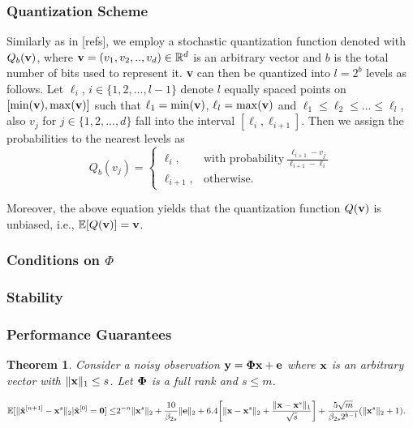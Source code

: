 \documentclass{article}
\newtheorem{theorem}{Theorem}
\begin{document}
\subsubsection{Quantization Scheme}
Similarly as in [refs], we employ a stochastic quantization function denoted with $Q_b({\bf v})$, where ${\bf v}=(v_1, v_2, .., v_d) \in \mathbb{R}^d$ is an arbitrary vector and $b$ is the total number of bits used to represent it. {\bf v} can then be quantized into $l=2^b$ levels as follows. Let $\ell_i$, $i\in \{1, 2, ..., l-1 \}$ denote $l$ equally spaced points on $[\min({\bf v}), \max({\bf v})]$ such that $\ell_1=\min({\bf v})$, $\ell_l=\max({\bf v})$ and $\ell_1\leq\ell_2 \leq ... \leq \ell_l$, also $v_j$ for $j\in \{1, 2, ..., d \}$ fall into the interval $[\ell_i, \ell_{i+1}]$. Then we assign the probabilities to the nearest levels as
 \[
    Q_b(v_j) = \left\{\begin{array}{lr}
        \ell_i, & \textrm{with probability} \ \frac{\ell_{i+1}-v_j}{\ell_{i+1}-\ell_i}\\
        \ell_{i+1},&\textrm{otherwise}.  \ \ \ \  \ \ \ \ \ \ \ \ \ \ \ \ \ \ 
        \end{array}
  \]

Moreover, the above equation yields that the quantization function $Q({\bf v})$ is unbiased, i.e., $\mathbb{E}[Q({\bf v})] = {\bf v}$.
\subsubsection{Conditions on $\Phi$}

\subsubsection{Stability}

\subsubsection{Performance Guarantees}
\begin{theorem}
Consider a noisy observation ${\bf y} = {\bf \Phi x}+{\bf e} $ where ${\bf x}$ is an arbitrary vector with $\|{\bf x} \|_1 \leq s$. Let ${\bf \Phi}$ is a full rank and $s\leq m$.
\end{theorem}
\begin{equation}
    \begin{split}
        \mathbb{E}[\|\hat{{\bf x}}^{[n+1]}-{\bf x}^s\|_2|\hat{{\bf x}}^{[0]}={\bf 0}] \leq &2^{-n}\|{\bf x}^{s}\|_2+ \frac{10}{\beta_{2s}}\|{\bf e} \|_2 +6.4\bigg  [ \|{\bf x}-{\bf x}^s \|_2 + \frac{\|{\bf x}-{\bf x}^s \|_1}{\sqrt{s}}\bigg] + \frac{5\sqrt{m}}{\beta_{2s}2^{b-1}}(\| {\bf x}^s\|_2+1).
    \end{split}
\end{equation}
\end{document}
